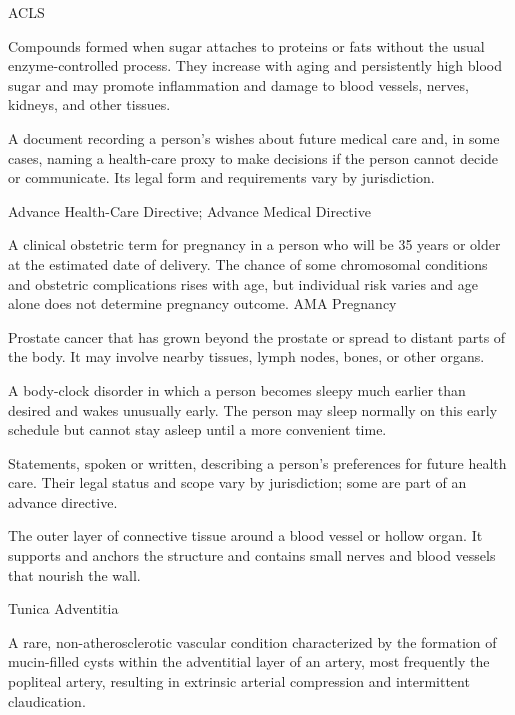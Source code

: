 \synonyms
ACLS

 Compounds formed when sugar attaches to proteins or fats without the usual enzyme-controlled process. They increase with aging and persistently high blood sugar and may promote inflammation and damage to blood vessels, nerves, kidneys, and other tissues.

 A document recording a person's wishes about future medical care and, in some cases, naming a health-care proxy to make decisions if the person cannot decide or communicate. Its legal form and requirements vary by jurisdiction.

\synonyms
Advance Health-Care Directive; Advance Medical Directive

 A clinical obstetric term for pregnancy in a person who will be 35 years or older at the estimated date of delivery. The chance of some chromosomal conditions and obstetric complications rises with age, but individual risk varies and age alone does not determine pregnancy outcome.
\synonyms
AMA Pregnancy

 Prostate cancer that has grown beyond the prostate or spread to distant parts of the body. It may involve nearby tissues, lymph nodes, bones, or other organs.

 A body-clock disorder in which a person becomes sleepy much earlier than desired and wakes unusually early. The person may sleep normally on this early schedule but cannot stay asleep until a more convenient time.

 Statements, spoken or written, describing a person's preferences for future health care. Their legal status and scope vary by jurisdiction; some are part of an advance directive.

 The outer layer of connective tissue around a blood vessel or hollow organ. It supports and anchors the structure and contains small nerves and blood vessels that nourish the wall.

\synonyms
Tunica Adventitia

 A rare, non-atherosclerotic vascular condition characterized by the formation of mucin-filled cysts within the adventitial layer of an artery, most frequently the popliteal artery, resulting in extrinsic arterial compression and intermittent claudication.


